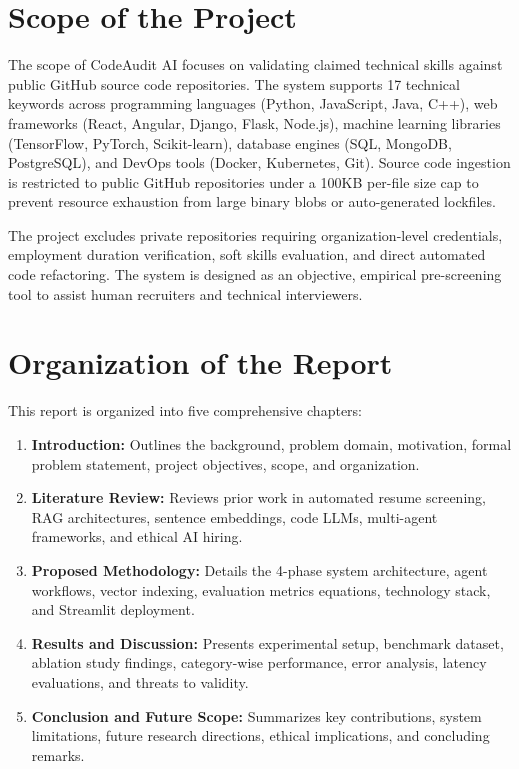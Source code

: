 \section{Scope of the Project}

The scope of CodeAudit AI focuses on validating claimed technical skills against public GitHub source code repositories. The system supports 17 technical keywords across programming languages (Python, JavaScript, Java, C++), web frameworks (React, Angular, Django, Flask, Node.js), machine learning libraries (TensorFlow, PyTorch, Scikit-learn), database engines (SQL, MongoDB, PostgreSQL), and DevOps tools (Docker, Kubernetes, Git). Source code ingestion is restricted to public GitHub repositories under a 100KB per-file size cap to prevent resource exhaustion from large binary blobs or auto-generated lockfiles.

The project excludes private repositories requiring organization-level credentials, employment duration verification, soft skills evaluation, and direct automated code refactoring. The system is designed as an objective, empirical pre-screening tool to assist human recruiters and technical interviewers.

\section{Organization of the Report}

This report is organized into five comprehensive chapters:
\begin{enumerate}[leftmargin=*, label={Chapter \arabic*:}]
    \item \textbf{Introduction:} Outlines the background, problem domain, motivation, formal problem statement, project objectives, scope, and organization.
    \item \textbf{Literature Review:} Reviews prior work in automated resume screening, RAG architectures, sentence embeddings, code LLMs, multi-agent frameworks, and ethical AI hiring.
    \item \textbf{Proposed Methodology:} Details the 4-phase system architecture, agent workflows, vector indexing, evaluation metrics equations, technology stack, and Streamlit deployment.
    \item \textbf{Results and Discussion:} Presents experimental setup, benchmark dataset, ablation study findings, category-wise performance, error analysis, latency evaluations, and threats to validity.
    \item \textbf{Conclusion and Future Scope:} Summarizes key contributions, system limitations, future research directions, ethical implications, and concluding remarks.
\end{enumerate}